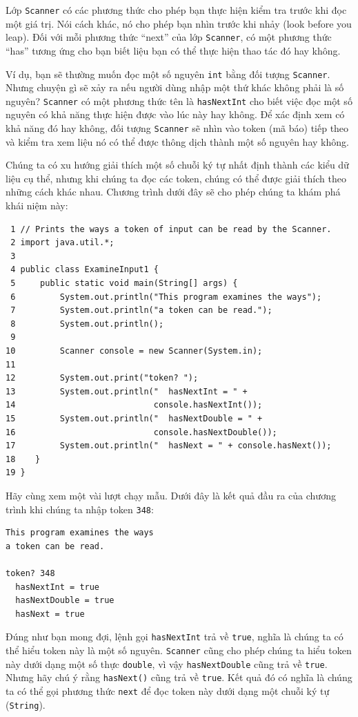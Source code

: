 Lớp \texttt{Scanner} có các phương thức cho phép bạn thực hiện kiểm tra trước khi đọc một giá trị. Nói cách khác, nó cho phép bạn nhìn trước khi nhảy (look before you leap). Đối với mỗi phương thức ``next'' của lớp \texttt{Scanner}, có một phương thức ``has'' tương ứng cho bạn biết liệu bạn có thể thực hiện thao tác đó hay không.

Ví dụ, bạn sẽ thường muốn đọc một số nguyên \texttt{int} bằng đối tượng \texttt{Scanner}. Nhưng chuyện gì sẽ xảy ra nếu người dùng nhập một thứ khác không phải là số nguyên? \texttt{Scanner} có một phương thức tên là \texttt{hasNextInt} cho biết việc đọc một số nguyên có khả năng thực hiện được vào lúc này hay không. Để xác định xem có khả năng đó hay không, đối tượng \texttt{Scanner} sẽ nhìn vào token (mã báo) tiếp theo và kiểm tra xem liệu nó có thể được thông dịch thành một số nguyên hay không.

Chúng ta có xu hướng giải thích một số chuỗi ký tự nhất định thành các kiểu dữ liệu cụ thể, nhưng khi chúng ta đọc các token, chúng có thể được giải thích theo những cách khác nhau. Chương trình dưới đây sẽ cho phép chúng ta khám phá khái niệm này:

\begin{verbatim}
 1 // Prints the ways a token of input can be read by the Scanner.
 2 import java.util.*;
 3
 4 public class ExamineInput1 {
 5     public static void main(String[] args) {
 6         System.out.println("This program examines the ways");
 7         System.out.println("a token can be read.");
 8         System.out.println();
 9
10         Scanner console = new Scanner(System.in);
11
12         System.out.print("token? ");
13         System.out.println("  hasNextInt = " +
14                            console.hasNextInt());
15         System.out.println("  hasNextDouble = " +
16                            console.hasNextDouble());
17         System.out.println("  hasNext = " + console.hasNext());
18    }
19 }
\end{verbatim}

Hãy cùng xem một vài lượt chạy mẫu. Dưới đây là kết quả đầu ra của chương trình khi chúng ta nhập token \texttt{348}:

\begin{verbatim}
This program examines the ways 
a token can be read. 
 
token? 348 
  hasNextInt = true 
  hasNextDouble = true 
  hasNext = true 
\end{verbatim}

Đúng như bạn mong đợi, lệnh gọi \texttt{hasNextInt} trả về \texttt{true}, nghĩa là chúng ta có thể hiểu token này là một số nguyên. \texttt{Scanner} cũng cho phép chúng ta hiểu token này dưới dạng một số thực \texttt{double}, vì vậy \texttt{hasNextDouble} cũng trả về \texttt{true}. Nhưng hãy chú ý rằng \texttt{hasNext()} cũng trả về \texttt{true}. Kết quả đó có nghĩa là chúng ta có thể gọi phương thức \texttt{next} để đọc token này dưới dạng một chuỗi ký tự (\texttt{String}).

